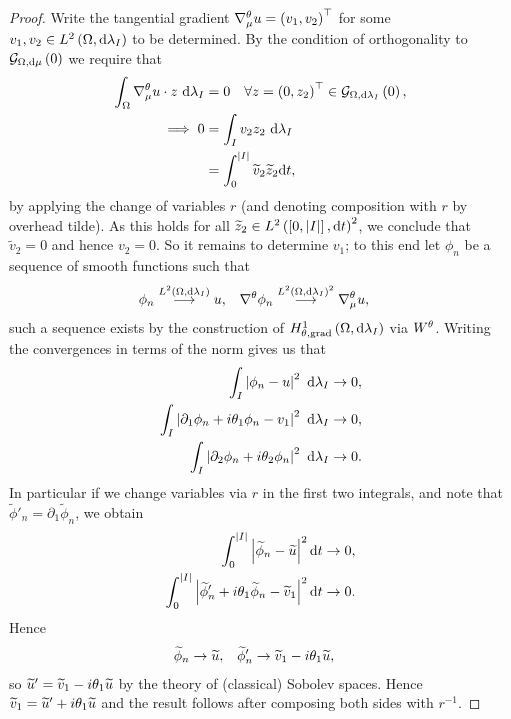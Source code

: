 \begin{proof}
	Write the tangential gradient $\nabla_\mu^\theta u = \left( v_1, v_2 \right)^\top$ for some $v_1,v_2\in L^{2}\left( \Omega,\mathrm{d}\lambda_I \right)$ to be determined.
	By the condition of orthogonality to $\mathcal{G}_{ \Omega, \mathrm{d}\mu}\left( 0 \right)$ we require that
	\begin{align*}
		\int_{\Omega}\nabla_\mu^\theta u \cdot z \ \mathrm{d}\lambda_I &= 0 \quad \forall z=\left( 0,z_2 \right)^\top\in\mathcal{G}_{ \Omega, \mathrm{d}\lambda_I}\left( 0 \right), \\
		\implies 0 &= \int_{I}v_2 z_2 \ \mathrm{d}\lambda_I \\
		&= \int_0^{\left\lvert I \right\rvert}\widetilde{v}_2\widetilde{z}_2 \mathrm{d} t,
	\end{align*}
	by applying the change of variables $r$ (and denoting composition with $r$ by overhead tilde).
	As this holds for all $\widetilde{z}_2\in L^{2}\left( \left[ 0,\left\lvert I \right\rvert \right],\mathrm{d}t \right)^2$, we conclude that $\widetilde{v}_2=0$ and hence $v_2=0$.
	So it remains to determine $v_1$; to this end let $\phi_n$ be a sequence of smooth functions such that
	\begin{align*}
		\phi_n \overset{L^{2}\left( \Omega,\mathrm{d}\lambda_I \right)}{\longrightarrow} u, &\quad \nabla^\theta \phi_n \overset{L^{2}\left( \Omega,\mathrm{d}\lambda_I \right)^2}{\longrightarrow} \nabla_\mu^\theta u,
	\end{align*}
	such a sequence exists by the construction of $H^1_{\theta, \mathrm{grad}}\left( \Omega, \mathrm{d}\lambda_I \right)$ via $W^\theta$.
	Writing the convergences in terms of the norm gives us that
	\begin{align*}
		\int_{I}\left\lvert \phi_n - u \right\rvert^2 \ \mathrm{d}\lambda_I &\rightarrow 0, \\
		\int_{I}\left\lvert \partial_1\phi_n + i\theta_1\phi_n - v_1 \right\rvert^2 \ \mathrm{d}\lambda_I &\rightarrow 0, \\
		\int_{I}\left\lvert \partial_2\phi_n + i\theta_2\phi_n \right\rvert^2 \ \mathrm{d}\lambda_I &\rightarrow 0.	
	\end{align*}
	In particular if we change variables via $r$ in the first two integrals, and note that $\widetilde{\phi}'_n = \partial_1\widetilde{\phi}_n$, we obtain
	\begin{align*}
		\int_0^{\left\lvert I \right\rvert}\left\lvert \widetilde{\phi}_n - \widetilde{u} \right\rvert^2 \mathrm{d} t \rightarrow 0, \\
		\int_0^{\left\lvert I \right\rvert}\left\lvert \widetilde{\phi}'_n + i\theta_1\widetilde{\phi}_n - \widetilde{v}_1  \right\rvert^2 \mathrm{d} t \rightarrow 0.
	\end{align*}
	Hence
	\begin{align*}
		\widetilde{\phi}_n \rightarrow \widetilde{u}, &\quad \widetilde{\phi}'_n \rightarrow \widetilde{v}_1 - i\theta_1\widetilde{u},
	\end{align*}
	so $\widetilde{u}' = \widetilde{v}_1 - i\theta_1\widetilde{u}$ by the theory of (classical) Sobolev spaces.
	Hence $\widetilde{v}_1 = \widetilde{u}' + i\theta_1\widetilde{u}$ and the result follows after composing both sides with $r^{-1}$.
\end{proof}

